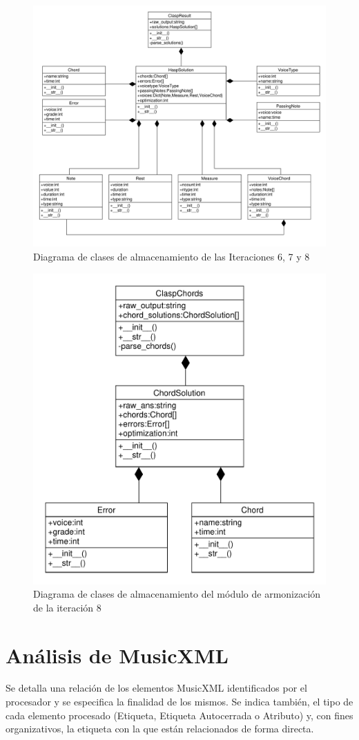 \begin{figure}[th]
	\centering
	\includegraphics[width=0.8\linewidth]{imagenes/sixth_seventh_eighth_iters.pdf}
	\caption{Diagrama de clases de almacenamiento de las Iteraciones 6, 7 y 8}
	\label{fig:class_diagram_sixth_seventh_eighth}
\end{figure}
\begin{figure}[th]
	\centering
	\includegraphics[width=0.8\linewidth]{imagenes/chord_diagram.pdf}
	\caption{Diagrama de clases de almacenamiento del módulo de armonización de la iteración 8}
	\label{fig:class_diagram_chords}
\end{figure}

\chapter{Análisis de MusicXML}
Se detalla una relación de los elementos MusicXML identificados por el procesador y se especifica la finalidad de los mismos. Se indica también, el tipo de cada elemento procesado (Etiqueta, Etiqueta Autocerrada o Atributo) y, con fines organizativos, la etiqueta con la que están relacionados de forma directa.

